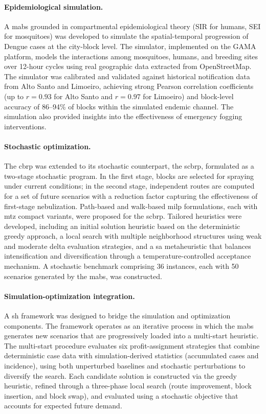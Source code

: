 \paragraph{Epidemiological simulation.}
A \gls{mabs} grounded in compartmental epidemiological theory (SIR for humans,
SEI for mosquitoes) was developed to simulate the spatial-temporal progression
of Dengue cases at the city-block level. The simulator, implemented on the GAMA
platform, models the interactions among mosquitoes, humans, and breeding sites
over 12-hour cycles using real geographic data extracted from OpenStreetMap. The
simulator was calibrated and validated against historical notification data from
Alto Santo and Limoeiro, achieving strong Pearson correlation coefficients
(up to $r = 0.93$ for Alto Santo and $r = 0.97$ for Limoeiro) and
block-level accuracy of 86--94\% of blocks within the simulated endemic
channel. The simulation also provided insights into the effectiveness of
emergency fogging interventions.

\paragraph{Stochastic optimization.}
The \gls{cbrp} was extended to its stochastic counterpart, the \gls{scbrp},
formulated as a two-stage stochastic program. In the first stage, blocks are
selected for spraying under current conditions; in the second stage, independent
routes are computed for a set of future scenarios with a reduction factor
capturing the effectiveness of first-stage nebulization. Path-based and
walk-based \gls{milp} formulations, each with \gls{mtz} compact variants, were
proposed for the \gls{scbrp}. Tailored heuristics were developed, including an
initial solution heuristic based on the deterministic greedy approach, a local
search with multiple neighborhood structures using weak and moderate delta
evaluation strategies, and a \gls{sa} metaheuristic that balances
intensification and diversification through a temperature-controlled acceptance
mechanism. A stochastic benchmark comprising 36 instances, each with 50
scenarios generated by the \gls{mabs}, was constructed.

\paragraph{Simulation-optimization integration.}
A \gls{sh} framework was designed to bridge the simulation and optimization
components. The framework operates as an iterative process in which the
\gls{mabs} generates new scenarios that are progressively loaded into a
multi-start heuristic. The multi-start procedure evaluates six
profit-assignment strategies that combine deterministic case data with
simulation-derived statistics (accumulated cases and incidence), using both
unperturbed baselines and stochastic perturbations to diversify the search.
Each candidate solution is constructed via the greedy heuristic, refined through
a three-phase local search (route improvement, block insertion, and block swap),
and evaluated using a stochastic objective that accounts for expected future
demand.

